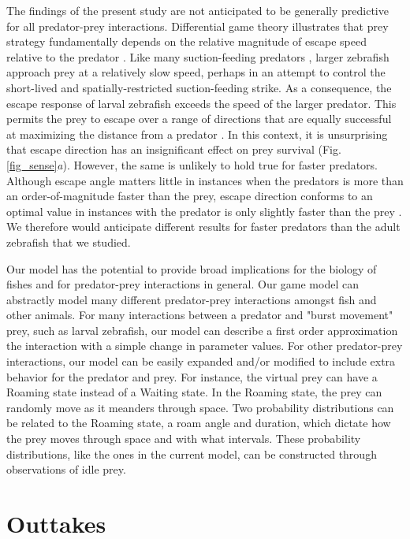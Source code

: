 \documentclass[]{rsos}%
\begin{document}
The findings of the present study are not anticipated to be generally predictive for all predator-prey interactions. 
Differential game theory illustrates that prey strategy fundamentally depends on the relative magnitude of escape speed relative to the predator \cite{Weihs:1984tb}.
Like many suction-feeding predators \cite{Higham:2005kg,Higham:2006ir}, larger zebrafish approach prey at a relatively slow speed, perhaps in an attempt to control the short-lived and spatially-restricted suction-feeding strike. 
As a consequence, the escape response of larval zebrafish exceeds the speed of the larger predator. 
This permits the prey to escape over a range of directions that are equally successful at maximizing the distance from a predator \cite{Soto:2015cj}.
In this context, it is unsurprising that escape direction has an insignificant effect on prey survival (Fig. \ref{fig_sense}\textit{a}).
However, the same is unlikely to hold true for faster predators.  
Although escape angle matters little in instances when the predators is more than an order-of-magnitude faster than the prey, escape direction conforms to an optimal value in instances with the predator is only slightly faster than the prey \cite{Weihs:1984tb}.
We therefore would anticipate different results for faster predators than the adult zebrafish that we studied.

Our model has the potential to provide broad implications for the biology of fishes and for predator-prey interactions in general.
Our game model can abstractly model many different predator-prey interactions amongst fish and other animals. 
For many interactions between a predator and "burst movement" prey, such as larval zebrafish, our model can describe a first order approximation the interaction with a simple change in parameter values.
For other predator-prey interactions, our model can be easily expanded and/or modified to include extra behavior for the predator and prey.
For instance, the virtual prey can have a Roaming state instead of a Waiting state.
In the Roaming state, the prey can randomly move as it meanders through space.
Two probability distributions can be related to the Roaming state, a roam angle and duration, which dictate how the prey moves through space and with what intervals.
 These probability distributions, like the ones in the current model, can be constructed through observations of idle prey. 



\section*{Outtakes}
\end{document}
